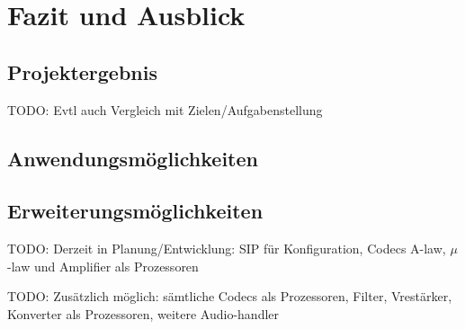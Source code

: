 \chapter{Fazit und Ausblick}
\section{Projektergebnis}
TODO: Evtl auch Vergleich mit Zielen/Aufgabenstellung
\section{Anwendungsmöglichkeiten}
\section{Erweiterungsmöglichkeiten}
TODO: Derzeit in Planung/Entwicklung: SIP für Konfiguration, Codecs A-law, $\mu$-law und Amplifier als Prozessoren

TODO: Zusätzlich möglich: sämtliche Codecs als Prozessoren, Filter, Vrestärker, Konverter als Prozessoren, weitere Audio-handler
